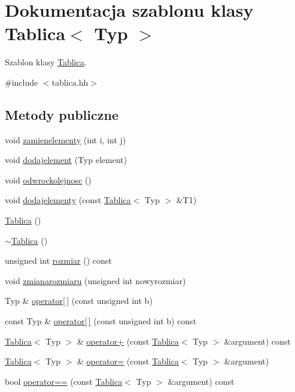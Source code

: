 \hypertarget{class_tablica}{\section{Dokumentacja szablonu klasy Tablica$<$ Typ $>$}
\label{class_tablica}
}


Szablon klasy \hyperlink{class_tablica}{Tablica}.  




{\ttfamily \#include $<$tablica.\-hh$>$}

\subsection*{Metody publiczne}
\begin{DoxyCompactItemize}
\item 
void \hyperlink{class_tablica_aea49337f0b2ee035ddc1df13ff228511}{zamienelementy} (int i, int j)
\item 
void \hyperlink{class_tablica_a630e070c59709cdfe436db9b2f57c81f}{dodajelement} (Typ element)
\item 
void \hyperlink{class_tablica_a405e0d82e9594f27cfc9dac94e53b582}{odwrockolejnosc} ()
\item 
void \hyperlink{class_tablica_ad139387fb64394e133e1e1b3402f7290}{dodajelementy} (const \hyperlink{class_tablica}{Tablica}$<$ Typ $>$ \&T1)
\item 
\hyperlink{class_tablica_a7d54bbcaa7963c50ee57e69f700b6cfc}{Tablica} ()
\item 
\hyperlink{class_tablica_aea2479778376598550fe82ec459a24ba}{$\sim$\-Tablica} ()
\item 
unsigned int \hyperlink{class_tablica_acf3f8d852711619ed205e1569f40f789}{rozmiar} () const 
\item 
void \hyperlink{class_tablica_aafcf1f86b79c0146fa313bae711cc97e}{zmianarozmiaru} (unsigned int nowyrozmiar)
\item 
Typ \& \hyperlink{class_tablica_a87f292495232b4f959291a3bc87bb829}{operator\mbox{[}$\,$\mbox{]}} (const unsigned int b)
\item 
const Typ \& \hyperlink{class_tablica_a5d41b52977f5bc0a3abf9e62cc209cc4}{operator\mbox{[}$\,$\mbox{]}} (const unsigned int b) const 
\item 
\hyperlink{class_tablica}{Tablica}$<$ Typ $>$ \& \hyperlink{class_tablica_acea602357c4cbb36f9bf71bc33d62090}{operator+} (const \hyperlink{class_tablica}{Tablica}$<$ Typ $>$ \&argument) const 
\item 
\hyperlink{class_tablica}{Tablica}$<$ Typ $>$ \& \hyperlink{class_tablica_a5145425b03eadaf6e97243f1fa5e5737}{operator=} (const \hyperlink{class_tablica}{Tablica}$<$ Typ $>$ \&argument)
\item 
bool \hyperlink{class_tablica_a5feb149bbeae655c6d7bafada90f9615}{operator==} (const \hyperlink{class_tablica}{Tablica}$<$ Typ $>$ \&argument) const 
\end{DoxyCompactItemize}
